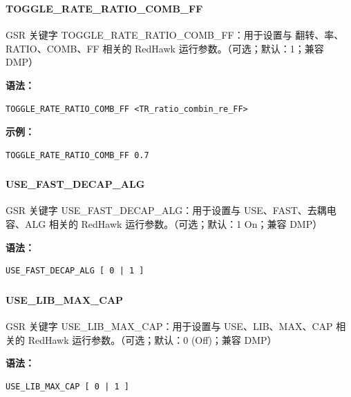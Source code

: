 \subsubsection{}
\paragraph*{TOGGLE_RATE_RATIO_COMB_FF}

GSR 关键字 TOGGLE_RATE_RATIO_COMB_FF：用于设置与 翻转、率、RATIO、COMB、FF 相关的 RedHawk 运行参数。（可选；默认：1；兼容 DMP）

\textbf{语法：}
\begin{lstlisting}
TOGGLE_RATE_RATIO_COMB_FF <TR_ratio_combin_re_FF>
\end{lstlisting}

\textbf{示例：}
\begin{lstlisting}
TOGGLE_RATE_RATIO_COMB_FF 0.7
\end{lstlisting}

\subsubsection{}
\paragraph*{USE_FAST_DECAP_ALG}

GSR 关键字 USE_FAST_DECAP_ALG：用于设置与 USE、FAST、去耦电容、ALG 相关的 RedHawk 运行参数。（可选；默认：1 On；兼容 DMP）

\textbf{语法：}
\begin{lstlisting}
USE_FAST_DECAP_ALG [ 0 | 1 ]
\end{lstlisting}

\subsubsection{}
\paragraph*{USE_LIB_MAX_CAP}

GSR 关键字 USE_LIB_MAX_CAP：用于设置与 USE、LIB、MAX、CAP 相关的 RedHawk 运行参数。（可选；默认：0 (Off)；兼容 DMP）

\textbf{语法：}
\begin{lstlisting}
USE_LIB_MAX_CAP [ 0 | 1 ]
\end{lstlisting}

